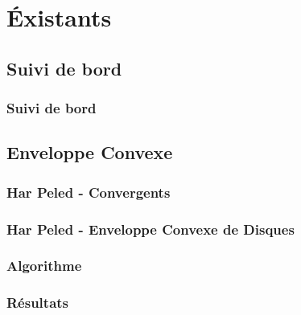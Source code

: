 \section{Éxistants}

\subsection{Suivi de bord}

\begin{frame}
\frametitle{Suivi de bord}

\end{frame}

\subsection{Enveloppe Convexe}

\begin{frame}
\frametitle{Har Peled - Convergents}

\end{frame}



\begin{frame}
\frametitle{Har Peled - Enveloppe Convexe de Disques}

\end{frame}

\begin{frame}
\frametitle{Algorithme}

\end{frame}

\begin{frame}
\frametitle{Résultats}

\end{frame}

